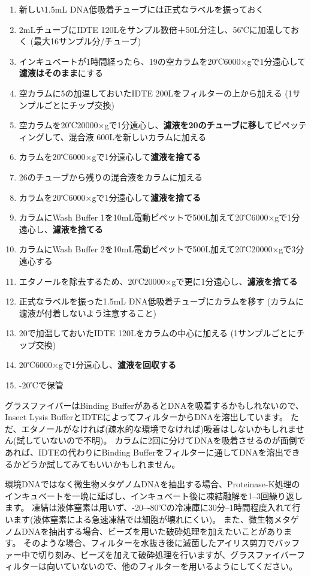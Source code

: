 \documentclass[titlepage,10pt,a4paper]{jsbook}
\begin{document}
\begin{enumerate}
\item 新しい1.5mL DNA低吸着チューブには正式なラベルを振っておく
\item 2mLチューブにIDTE 120{\textmu}Lをサンプル数倍＋50{\textmu}L分注し、56℃に加温しておく (最大16サンプル分/チューブ)
\item インキュベートが1時間経ったら、19の空カラムを20℃6000×gで1分遠心して\textbf{濾液はそのまま}にする
\item 空カラムに5の加温しておいたIDTE 200{\textmu}Lをフィルターの上から加える (1サンプルごとにチップ交換)
\item 空カラムを20℃20000×gで1分遠心し、\textbf{濾液を20のチューブに移し}てピペッティングして、混合液 600{\textmu}Lを新しいカラムに加える
\item カラムを20℃6000×gで1分遠心して\textbf{濾液を捨てる}
\item 26のチューブから残りの混合液をカラムに加える
\item カラムを20℃6000×gで1分遠心して\textbf{濾液を捨てる}
\item カラムにWash Buffer 1を10mL電動ピペットで500{\textmu}L加えて20℃6000×gで1分遠心し、\textbf{濾液を捨てる}
\item カラムにWash Buffer 2を10mL電動ピペットで500{\textmu}L加えて20℃20000×gで3分遠心する
\item エタノールを除去するため、20℃20000×gで更に1分遠心し、\textbf{濾液を捨てる}
\item 正式なラベルを振った1.5mL DNA低吸着チューブにカラムを移す (カラムに濾液が付着しないよう注意すること)
\item 20で加温しておいたIDTE 120{\textmu}Lをカラムの中心に加える (1サンプルごとにチップ交換)
\item 20℃6000×gで1分遠心し、\textbf{濾液を回収する}
\item -20℃で保管
\end{enumerate}

グラスファイバーはBinding BufferがあるとDNAを吸着するかもしれないので、Insect Lysis BufferとIDTEによってフィルターからDNAを溶出しています。
ただ、エタノールがなければ(疎水的な環境でなければ)吸着はしないかもしれません(試していないので不明)。
カラムに2回に分けてDNAを吸着させるのが面倒であれば、IDTEの代わりにBinding Bufferをフィルターに通してDNAを溶出できるかどうか試してみてもいいかもしれません。

環境DNAではなく微生物メタゲノムDNAを抽出する場合、Proteinase-K処理のインキュベートを一晩に延ばし、インキュベート後に凍結融解を1--3回繰り返します。
凍結は液体窒素は用いず、{-20}--{-80}℃の冷凍庫に30分--1時間程度入れて行います(液体窒素による急速凍結では細胞が壊れにくい)。
また、微生物メタゲノムDNAを抽出する場合、ビーズを用いた破砕処理を加えたいことがあります。
そのような場合、フィルターを水抜き後に滅菌したアイリス剪刀でバッファー中で切り刻み、ビーズを加えて破砕処理を行いますが、グラスファイバーフィルターは向いていないので、他のフィルターを用いるようにしてください。
\end{document}
